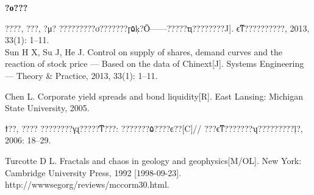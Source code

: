 \documentclass[twoside,CJK]{cctart}
\def\REFERENCE{\vspace*{.2in}
{\noindent\bf\heiti\zihao{5}?ο???} \vspace*{.1in}}
\begin{document}

\REFERENCE

{\small \baselineskip 12pt




\REF{[1]}
????, ???, ?μ?
?????????ơ???????ɼ۵ķ?Ӧ------?????ҵ????????J].
ϵͳ??????????, 2013, 33(1): 1--11. \\
Sun H X, Su J, He J. Control on supply of shares, demand curves
and the reaction of stock price --- Based on the data of
Chinext[J]. Systems Engineering --- Theory \& Practice, 2013,
33(1): 1--11.%

\REF{[2]} Chen L. Corporate yield spreads and bond liquidity[R]. East Lansing: Michigan State University, 2005. %

\REF{[3]} ϯ??, ???? ????????γɻ?????ͳ???:
???????۵????ͼ??[C]//
???ϵͳ???????ʮ?????????ļ?, 2006: 18--29.%

\REF{[4]} Turcotte D L. Fractals and chaos in geology and
geophysics[M/OL]. New York: Cambridge University Press, 1992
[1998-09-23]. http://wwwsegorg/reviews/mccorm30.html.%

}
\end{document}

